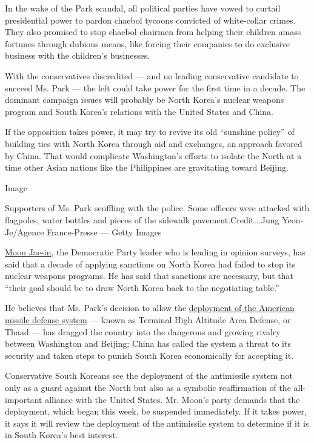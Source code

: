In the wake of the Park scandal, all political parties have vowed to
curtail presidential power to pardon chaebol tycoons convicted of
white-collar crimes. They also promised to stop chaebol chairmen from
helping their children amass fortunes through dubious means, like
forcing their companies to do exclusive business with the children's
businesses.

With the conservatives discredited --- and no leading conservative
candidate to succeed Ms. Park --- the left could take power for the
first time in a decade. The dominant campaign issues will probably be
North Korea's nuclear weapons program and South Korea's relations with
the United States and China.

If the opposition takes power, it may try to revive its old ``sunshine
policy'' of building ties with North Korea through aid and exchanges, an
approach favored by China. That would complicate Washington's efforts to
isolate the North at a time other Asian nations like the Philippines are
gravitating toward Beijing.

Image

Supporters of Ms. Park scuffling with the police. Some officers were
attacked with flagpoles, water bottles and pieces of the sidewalk
pavement.Credit...Jung Yeon-Je/Agence France-Presse --- Getty Images

\href{https://www.nytimes3xbfgragh.onion/2016/12/09/world/asia/south-korea-who-could-replace-park.html}{Moon
Jae-in}, the Democratic Party leader who is leading in opinion surveys,
has said that a decade of applying sanctions on North Korea had failed
to stop its nuclear weapons programs. He has said that sanctions are
necessary, but that ``their goal should be to draw North Korea back to
the negotiating table.''

He believes that Ms. Park's decision to allow the
\href{https://www.nytimes3xbfgragh.onion/2017/03/06/world/asia/north-korea-thaad-missile-defense-us-china.html}{deployment
of the American missile defense system} --- known as Terminal High
Altitude Area Defense, or Thaad --- has dragged the country into the
dangerous and growing rivalry between Washington and Beijing; China has
called the system a threat to its security and taken steps to punish
South Korea economically for accepting it.

Conservative South Koreans see the deployment of the antimissile system
not only as a guard against the North but also as a symbolic
reaffirmation of the all-important alliance with the United States. Mr.
Moon's party demands that the deployment, which began this week, be
suspended immediately. If it takes power, it says it will review the
deployment of the antimissile system to determine if it is in South
Korea's best interest.

